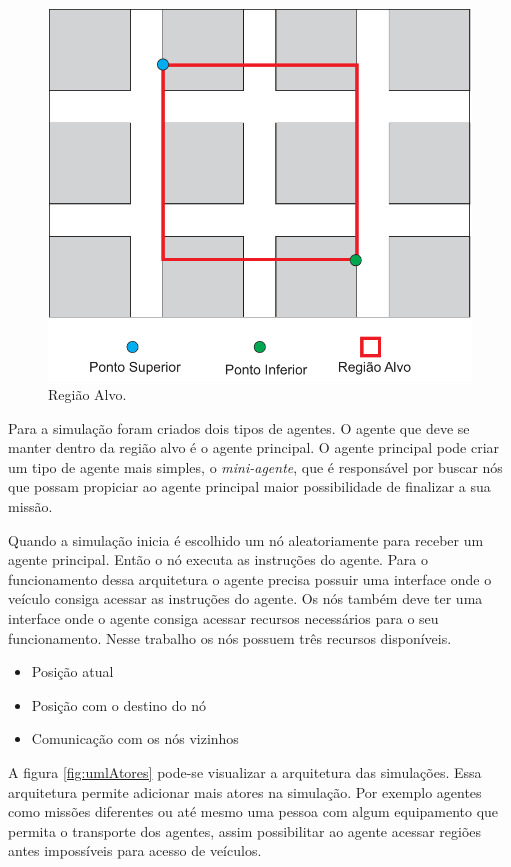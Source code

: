 \begin{figure}[htbp]
	\centering
	\includegraphics[scale=0.7]{metodologia/figuras/regiaoAlvo.pdf}
	\caption{Região Alvo.}
	\label{fig:regiaoAlvo}
\end{figure}

Para a simulação foram criados dois tipos de agentes. O agente que deve se manter dentro da região alvo é o agente principal. O agente principal pode criar um tipo de agente mais simples, o \emph{mini-agente}, que é responsável por buscar nós que possam propiciar ao agente principal maior possibilidade de finalizar a sua missão.

Quando a simulação inicia é escolhido um nó aleatoriamente para receber um agente principal. Então o nó executa as instruções do agente. Para o funcionamento dessa arquitetura o agente precisa possuir uma interface onde o veículo consiga acessar as instruções do agente. Os nós também deve ter uma interface onde o agente consiga acessar recursos necessários para o seu funcionamento. Nesse trabalho os nós possuem três recursos disponíveis.

\begin{itemize}
	\item Posição atual
	\item Posição com o destino do nó
	\item Comunicação com os nós vizinhos
\end{itemize} 

A figura \ref{fig:umlAtores} pode-se visualizar a arquitetura das simulações. Essa arquitetura permite adicionar mais atores na simulação. Por exemplo agentes como missões diferentes ou até mesmo uma pessoa com algum equipamento que permita o transporte dos agentes, assim possibilitar ao agente acessar regiões antes impossíveis para acesso de veículos. 

